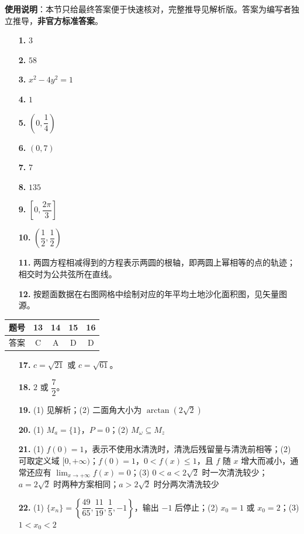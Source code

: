 
\begin{gknotice}
\textbf{使用说明}：本节只给最终答案便于快速核对，完整推导见解析版。答案为编写者独立推导，\textbf{非官方标准答案}。
\end{gknotice}

\begin{itemize}[leftmargin=2.6em]
  \item[\textbf{1.}] $3$
  \item[\textbf{2.}] $58$
  \item[\textbf{3.}] $x^2-4y^2=1$
  \item[\textbf{4.}] $1$
  \item[\textbf{5.}] $\left(0,\dfrac14\right)$
  \item[\textbf{6.}] $(0,7)$
  \item[\textbf{7.}] $7$
  \item[\textbf{8.}] $135$
  \item[\textbf{9.}] $\left[0,\dfrac{2\pi}{3}\right]$
  \item[\textbf{10.}] $\left(\dfrac12,\dfrac12\right)$
  \item[\textbf{11.}] 两圆方程相减得到的方程表示两圆的根轴，即两圆上幂相等的点的轨迹；相交时为公共弦所在直线。
  \item[\textbf{12.}] 按题面数据在右图网格中绘制对应的年平均土地沙化面积图，见矢量图源。
\end{itemize}

\begin{center}\begin{tabular}{ccccc}
\toprule
题号 & 13 & 14 & 15 & 16 \\
\midrule
答案 & C & A & D & D \\
\bottomrule
\end{tabular}\end{center}

\begin{itemize}[leftmargin=2.6em]
  \item[\textbf{17.}] $c=\sqrt{21}$ 或 $c=\sqrt{61}$。
  \item[\textbf{18.}] $2$ 或 $\dfrac72$。
  \item[\textbf{19.}] (1) 见解析；(2) 二面角大小为 $\arctan(2\sqrt2)$
  \item[\textbf{20.}] (1) $M_a=\{1\}$，$P=0$；(2) $M_\omega\subseteq M_z$
  \item[\textbf{21.}] (1) $f(0)=1$，表示不使用水清洗时，清洗后残留量与清洗前相等；(2) 可取定义域 $[0,+\infty)$；$f(0)=1$，$0<f(x)\le1$，且 $f$ 随 $x$ 增大而减小，通常还应有 $\displaystyle\lim_{x\to+\infty}f(x)=0$；(3) $0<a<2\sqrt2$ 时一次清洗较少；$a=2\sqrt2$ 时两种方案相同；$a>2\sqrt2$ 时分两次清洗较少
  \item[\textbf{22.}] (1) $\{x_n\}=\left\{\dfrac{49}{65},\dfrac{11}{19},\dfrac15,-1\right\}$，输出 $-1$ 后停止；(2) $x_0=1$ 或 $x_0=2$；(3) $1<x_0<2$
\end{itemize}
